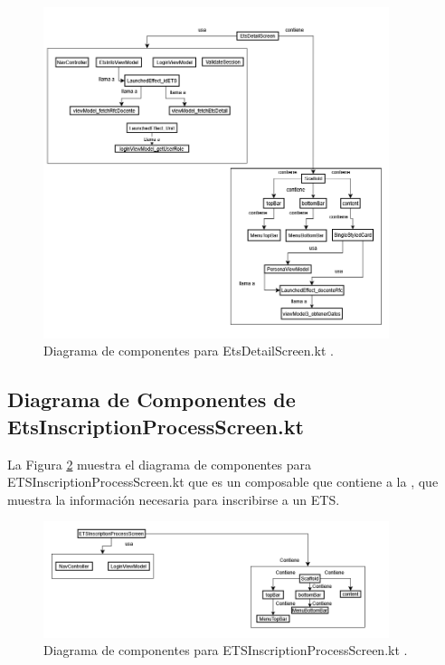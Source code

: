 \begin{figure}[htbp!]
	\begin{center}
		\includegraphics[width=0.9\textwidth]{DiagramasMoviles/DCM (20)}
		\caption{Diagrama de componentes para EtsDetailScreen.kt .}
		\label{fig:Componentes_7}
	\end{center}
\end{figure}

\newpage

\subsection{Diagrama de Componentes de EtsInscriptionProcessScreen.kt}

La Figura \ref{fig:Componentes_8} muestra el diagrama de componentes para ETSInscriptionProcessScreen.kt que es un composable que contiene a la , que muestra la información necesaria para inscribirse a un ETS.

\begin{figure}[htbp!]
	\begin{center}
		\includegraphics[width=0.9\textwidth]{DiagramasMoviles/DCM (21)}
		\caption{Diagrama de componentes para ETSInscriptionProcessScreen.kt .}
		\label{fig:Componentes_8}
	\end{center}
\end{figure}

